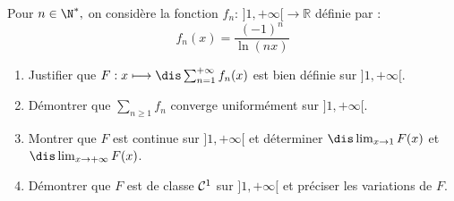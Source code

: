 \documentclass[a4paper,10pt]{report}
\newcommand{\Sum}[2]{\ensuremath{\textstyle{\sum\limits_{#1}^{#2}}}}
\begin{document}
\begin{Exercice}{} Pour $n\in\N^*,$ on considère la fonction $f_n : \, ] 1,+\infty[ \rightarrow \mathbb{R}$ définie par :
$$ f_n(x)=\frac{(-1)^n}{\ln(nx)}$$

\begin{enumerate}
	\item Justifier que $F : x\longmapsto \dis\sum_{n=1}^{+\infty} f_n(x)$ est bien définie sur $]1,+\infty[.$
	
	\item Démontrer que $\Sum{n\geq 1}{} f_n$ converge uniformément sur $]1,+\infty[.$ 
	
	\item Montrer que $F$ est continue sur $]1,+\infty[$ et déterminer $\dis\lim_{x \rightarrow 1}F(x)$ et  $\dis\lim_{x \rightarrow  +\infty}F(x)$.
	
	\item Démontrer que $F$ est de classe ${\cal C}^1$ sur $]1,+\infty[$ et préciser les variations de $F.$
\end{enumerate}
\end{Exercice}

\corr  
\end{document}
